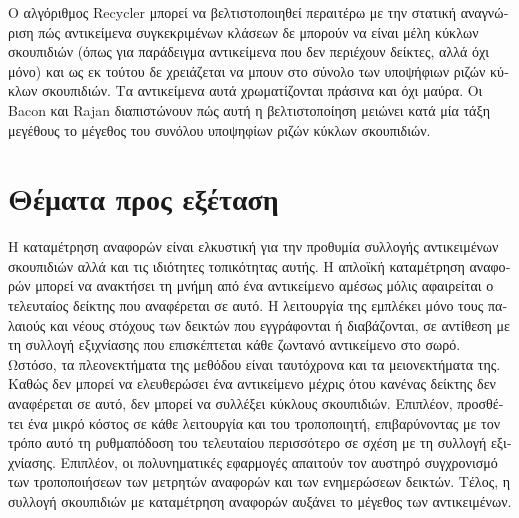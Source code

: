 \begin{greek}
Ο αλγόριθμος Recycler μπορεί να βελτιστοποιηθεί περαιτέρω με
την στατική αναγνώριση πώς αντικείμενα συγκεκριμένων κλάσεων
δε μπορούν να είναι μέλη κύκλων σκουπιδιών (όπως για παράδειγμα
αντικείμενα που δεν περιέχουν δείκτες, αλλά όχι μόνο) και
ως εκ τούτου δε χρειάζεται να μπουν στο σύνολο των υποψήφιων
ριζών κύκλων σκουπιδιών. Τα αντικείμενα αυτά χρωματίζονται
πράσινα και όχι μαύρα. Οι Bacon και Rajan \cite{DBLP:conf/ecoop/BaconR01} διαπιστώνουν πώς αυτή η
βελτιστοποίηση μειώνει κατά μία τάξη μεγέθους το μέγεθος
του συνόλου υποψηφίων ριζών κύκλων σκουπιδιών. 

\section{Θέματα προς εξέταση}
Η καταμέτρηση αναφορών είναι ελκυστική για την προθυμία
συλλογής αντικειμένων σκουπιδιών αλλά και τις ιδιότητες
τοπικότητας αυτής. Η απλοϊκή καταμέτρηση αναφορών μπορεί
να ανακτήσει τη μνήμη από ένα αντικείμενο αμέσως μόλις
αφαιρείται ο τελευταίος δείκτης που αναφέρεται σε αυτό.
Η λειτουργία της εμπλέκει μόνο τους παλαιούς και νέους
στόχους των δεικτών που εγγράφονται ή διαβάζονται, σε
αντίθεση με τη συλλογή εξιχνίασης που επισκέπτεται κάθε
ζωντανό αντικείμενο στο σωρό. Ωστόσο, τα πλεονεκτήματα
της μεθόδου είναι ταυτόχρονα και τα μειονεκτήματα της.
Καθώς δεν μπορεί να ελευθερώσει ένα αντικείμενο μέχρις
ότου κανένας δείκτης δεν αναφέρεται σε αυτό, δεν μπορεί
να συλλέξει κύκλους σκουπιδιών. Επιπλέον, προσθέτει ένα
μικρό κόστος σε κάθε λειτουργία \textenglish{} και
\textenglish{} του τροποποιητή, επιβαρύνοντας με τον
τρόπο αυτό τη ρυθμαπόδοση του τελευταίου περισσότερο σε
σχέση με τη συλλογή εξιχνίασης. Επιπλέον, οι πολυνηματικές
εφαρμογές απαιτούν τον αυστηρό συγχρονισμό των τροποποιήσεων
των μετρητών αναφορών και των ενημερώσεων δεικτών. Τέλος,
η συλλογή σκουπιδιών με καταμέτρηση αναφορών αυξάνει το
μέγεθος των αντικειμένων.


\end{greek}
